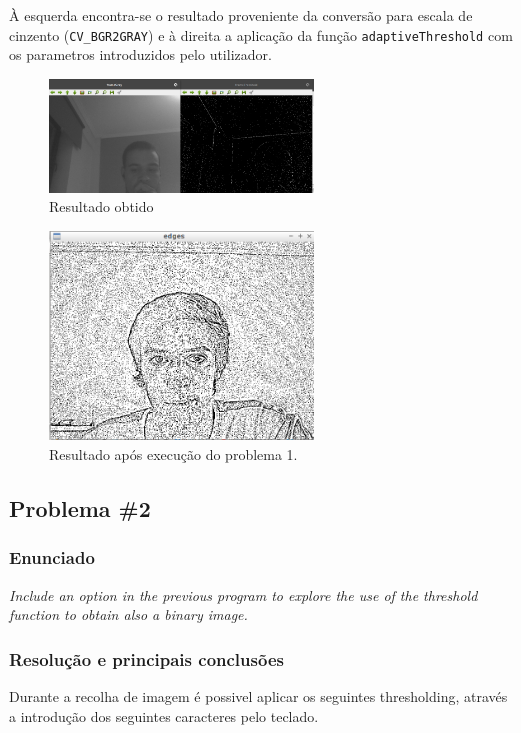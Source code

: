 \documentclass[portuguese, times, mirror]{revdetua}
\begin{document}
À esquerda encontra-se o resultado proveniente da conversão para escala de cinzento (\texttt{CV\_BGR2GRAY}) e à direita a aplicação da função \texttt{adaptiveThreshold} com os parametros introduzidos pelo utilizador. 

\begin{figure}[ht!]
\centering
\includegraphics[width=70mm]{img/ex1_!.png}
\caption{Resultado obtido}
\end{figure}





\begin{figure}[ht!]
\centering
\includegraphics[width=70mm]{img/ex1.png}
\caption{Resultado após execução do problema 1.}
\end{figure}

\subsection{Problema \#2}

\subsubsection{Enunciado}
\textit{ Include an option in the previous program to explore the use of the threshold function to obtain
also a binary image.}

\subsubsection{Resolução e principais conclusões}



Durante a recolha de imagem é possivel aplicar os seguintes thresholding, através a introdução dos seguintes caracteres pelo teclado. 
\end{document}
